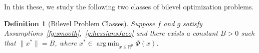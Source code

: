 \documentclass{osudissert96}
\DeclareMathOperator*{\argmin}{arg\,min}
\newtheorem{definition}{Definition}
\begin{document}
In this these, we study the following two classes of bilevel optimization problems. 
\begin{definition}[Bilevel Problem Classes]\label{de:pc}
Suppose $f$ and $g$ satisfy Assumptions~\ref{fg:smooth},~\ref{g:hessiansJaco} and there exists a constant $B>0$ such that  $\|x^*\|=B$, where $x^*\in\argmin_{x\in\mathbb{R}^p}\Phi(x)$.

\end{definition}
\end{document}
